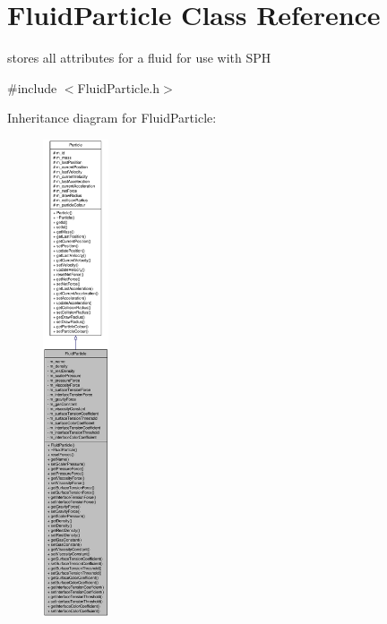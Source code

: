 \hypertarget{class_fluid_particle}{
\section{FluidParticle Class Reference}
\label{class_fluid_particle}
}


stores all attributes for a fluid for use with SPH  




{\ttfamily \#include $<$FluidParticle.h$>$}



Inheritance diagram for FluidParticle:\nopagebreak
\begin{figure}[H]
\begin{center}
\leavevmode
\includegraphics[height=400pt]{class_fluid_particle__inherit__graph}
\end{center}
\end{figure}


